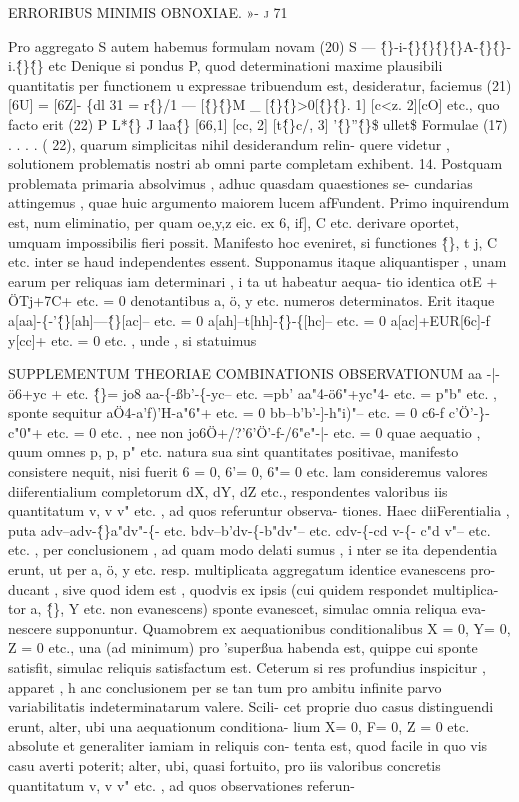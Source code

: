 \documentclass[12pt,a4paper]{article}
\begin{document}
\newpage
\begin{center}
\textsc{ERRORIBUS MINIMIS OBNOXIAE. »- j 71}
\end{center}
Pro aggregato S autem habemus formulam novam (20)
S --- \^\{\}-i-\^\{\}\^\{\}\^\{\}\^\{\}A-\^\{\}\^\{\}-i.\^\{\}\^\{\} etc
Denique si pondus P, quod determinationi maxime plausibili quantitatis per
functionem u expressae tribuendum est, desideratur, faciemus (21)
[6U] = [6Z]-\texttrademark
\{dl 31 = r\^\{\}/1 --- [\^\{\}\^\{\}M \_ [\^\{\}\^\{\}>0[\^\{\}\^\{\}. 1] [c<z. 2][cO]
etc., quo facto erit (22)
P L*\^\{\} J laa\^\{\} [66,1] [cc, 2] [t\^\{\}c/, 3] '\^\{\}''\^\{\}\$ullet\$
Formulae (17) . . . . ( 22), quarum simplicitas nihil desiderandum relin-
quere videtur , solutionem problematis nostri ab omni parte completam exhibent.
14.
Postquam problemata primaria absolvimus , adhuc quasdam quaestiones se-
cundarias attingemus , quae huic argumento maiorem lucem afFundent.
Primo inquirendum est, num eliminatio, per quam oe,y,z eic. ex 6, if], C etc.
derivare oportet, umquam impossibilis fieri possit. Manifesto hoc eveniret, si
functiones \^\{\}, t j, C etc. inter se haud independentes essent. Supponamus itaque
aliquantisper , unam earum per reliquas iam determinari , i ta ut habeatur aequa-
tio identica
otE + ÖTj+7C+ etc. = 0
denotantibus a, ö, y etc. numeros determinatos. Erit itaque
a[aa]-\{-'\^\{\}[ah]---\^\{\}[ac]-- etc. = 0
a[ah]--t[hh]-\^\{\}-\{[hc]-- etc. = 0
a[ac]+EUR[6c]-f y[cc]+ etc. = 0
etc. , unde , si statuimus

 SUPPLEMENTUM THEORIAE COMBINATIONIS OBSERVATIONUM
aa -|-ö6+yc + etc. \^\{\}= jo8
aa-\{-ßb'-\{-yc-- etc. =pb'
aa"4-ö6"+yc"4- etc. = p"b"
etc. , sponte sequitur
aÖ4-a'f)'H-a"6"+ etc. = 0
bb--b'b'-]-h"i)"-- etc. = 0
c6-f c'Ö'-\}-c"0"+ etc. = 0
etc. , nee non
jo6Ö+/?'6'Ö'-f-/6"e"-|- etc. = 0
quae aequatio , quum omnes p, p, p" etc. natura sua sint quantitates positivae,
manifesto consistere nequit, nisi fuerit 6 = 0, 6'= 0, 6"= 0 etc.
lam consideremus valores diiferentialium completorum dX, dY, dZ etc.,
respondentes valoribus iis quantitatum v, v v" etc. , ad quos referuntur observa-
tiones. Haec diiFerentialia , puta
adv--adv-\^\{\}a"dv"-\{- etc.
bdv--b'dv-\{-b"dv"-- etc.
cdv-\{-cd v-\{- c"d v"-- etc.
etc. , per conclusionem , ad quam modo delati sumus , i nter se ita dependentia
erunt, ut per a, ö, y etc. resp. multiplicata aggregatum identice evanescens pro-
ducant , sive quod idem est , quodvis ex ipsis (cui quidem respondet multiplica-
tor a, \^\{\}, Y etc. non evanescens) sponte evanescet, simulac omnia reliqua eva-
nescere supponuntur. Quamobrem ex aequationibus conditionalibus X = 0,
Y= 0, Z = 0 etc., una (ad minimum) pro 'superßua habenda est, quippe cui
sponte satisfit, simulac reliquis satisfactum est.
Ceterum si res profundius inspicitur , apparet , h anc conclusionem per se
tan tum pro ambitu infinite parvo variabilitatis indeterminatarum valere. Scili-
cet proprie duo casus distinguendi erunt, alter, ubi una aequationum conditiona-
lium X= 0, F= 0, Z = 0 etc. absolute et generaliter iamiam in reliquis con-
tenta est, quod facile in quo vis casu averti poterit; alter, ubi, quasi fortuito, pro
iis valoribus concretis quantitatum v, v v" etc. , ad quos observationes referun-
\end{document}
